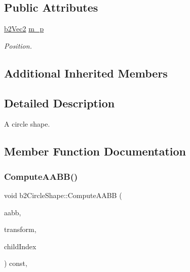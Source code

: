 \subsection*{Public Attributes}
\begin{DoxyCompactItemize}
\item 
\mbox{\label{classb2CircleShape_a190705618b2e65f636f1dc03c63640ff}} 
\mbox{\hyperlink{structb2Vec2}{b2\+Vec2}} \mbox{\hyperlink{classb2CircleShape_a190705618b2e65f636f1dc03c63640ff}{m\+\_\+p}}
\begin{DoxyCompactList}\small\item\em Position. \end{DoxyCompactList}\end{DoxyCompactItemize}
\subsection*{Additional Inherited Members}


\subsection{Detailed Description}
A circle shape. 

\subsection{Member Function Documentation}
\mbox{\label{classb2CircleShape_af4a4ea78780af7a7ce40bf5d54affe83}} 
\subsubsection{\texorpdfstring{Compute\+A\+A\+B\+B()}{ComputeAABB()}}
{\footnotesize\ttfamily void b2\+Circle\+Shape\+::\+Compute\+A\+A\+BB (\begin{DoxyParamCaption}\item[{\mbox{\hyperlink{structb2AABB}{b2\+A\+A\+BB}} $\ast$}]{aabb,  }\item[{const \mbox{\hyperlink{structb2Transform}{b2\+Transform}} \&}]{transform,  }\item[{int32}]{child\+Index }\end{DoxyParamCaption}) const\hspace{0.3cm}{\ttfamily [override]}, {\ttfamily [virtual]}}

